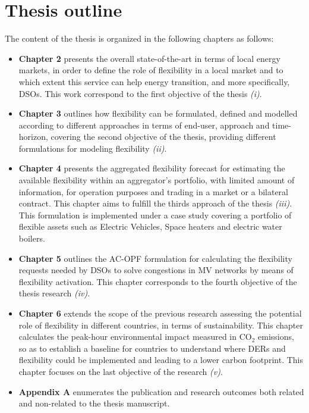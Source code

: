 \section{Thesis outline}
The content of the thesis is organized in the following chapters as follows:
\begin{itemize}
\item \textbf{Chapter 2} presents the overall state-of-the-art in terms of local energy markets, in order to define the role of flexibility in a local market and to which extent this service can help energy transition, and more specifically, DSOs. This work correspond to the first objective of the thesis \textit{(i)}. 
\item \textbf{Chapter 3} outlines how flexibility can be formulated, defined and modelled according to different approaches in terms of end-user, approach and time-horizon, covering the second objective of the thesis, providing different formulations for modeling flexibility \textit{(ii)}. 
\item \textbf{Chapter 4} presents the aggregated flexibility forecast for estimating the available flexibility within an aggregator's portfolio, with limited amount of information, for operation purposes and trading in a market or a bilateral contract. This chapter aims to fulfill the thirds approach of the thesis \textit{(iii)}. This formulation is implemented under a case study covering a portfolio of flexible assets such as Electric Vehicles, Space heaters and electric water boilers.  
\item \textbf{Chapter 5} outlines the AC-OPF formulation for calculating the flexibility requests needed by DSOs to solve congestions in MV networks by means of flexibility activation. This chapter corresponds to the fourth objective of the thesis research \textit{(iv)}.  
\item \textbf{Chapter 6} extends the scope of the previous research assessing the potential role of flexibility in different countries, in terms of sustainability. This chapter calculates the peak-hour environmental impact measured in CO$_2$ emissions, so as to establish a baseline for countries to understand where DERs and flexibility could be implemented and leading to a lower carbon footprint. This chapter focuses on the last objective of the research \textit{(v)}. 
\item \textbf{Appendix A} enumerates the publication and research outcomes both related and non-related to the thesis manuscript. 
\end{itemize}


